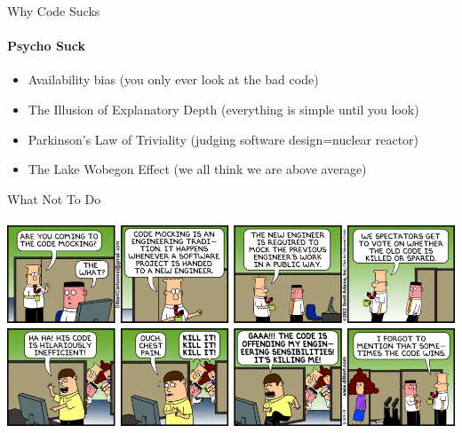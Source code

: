 \documentclass[bigger]{beamer}
\begin{document}
\begin{frame}{Why Code Sucks}
  \framesubtitle{Psycho Suck}
  \begin{itemize}
    \item Availability bias (you only ever look at the bad code)
    \pause
    \item The Illusion of Explanatory Depth (everything is simple until you look)
    \pause
    \item Parkinson's Law of Triviality (judging software design=nuclear reactor)
    \pause
    \item The Lake Wobegon Effect (we all think we are above average)
  \end{itemize}
\end{frame}

\begin{frame}{What Not To Do}
  \framesubtitle{}
  \includegraphics[width=\textwidth]{images/code-mocking.png}
\end{frame}
\end{document}
